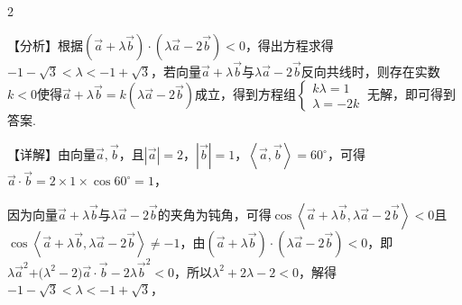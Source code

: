 \begin{multicols}{2}






\bindp 【分析】根据\(\left( \overrightarrow{a} + \lambda\overrightarrow{b} \right) \cdot \allowbreak\left( \lambda\overrightarrow{a} - 2\overrightarrow{b} \right) < 0\)，得出方程求得\(- 1 - \sqrt{3} < \lambda < - 1 + \sqrt{3}\)，若向量\(\overrightarrow{a} + \lambda\overrightarrow{b}\)与\(\lambda\overrightarrow{a} - 2\overrightarrow{b}\)反向共线时，则存在实数\(k < 0\)使得\(\overrightarrow{a} + \lambda\overrightarrow{b} = k(\lambda\overrightarrow{a} - 2\overrightarrow{b})\)成立，得到方程组\(\left\{ \begin{array}{r}
k\lambda = 1 \\
\lambda = - 2k
\end{array} \right.\ \)无解，即可得到答案.

\bindp 【详解】由向量\(\overrightarrow{a},\overrightarrow{b}\)，且\(\left| \overrightarrow{a} \right| = 2\)，\(\left| \overrightarrow{b} \right| = 1\)，\(\left\langle \overrightarrow{a},\overrightarrow{b} \right\rangle = 60^{\circ}\)，可得\(\overrightarrow{a} \cdot \overrightarrow{b} = 2 \times 1 \times \cos 60^{\circ} = 1\)，

\bindp 因为向量\(\overrightarrow{a} + \lambda\overrightarrow{b}\)与\(\lambda\overrightarrow{a} - 2\overrightarrow{b}\)的夹角为钝角，可得\(\cos\left\langle \overrightarrow{a} + \lambda\overrightarrow{b},\lambda\overrightarrow{a} - 2\overrightarrow{b} \right\rangle < 0\)且\(\cos\left\langle \overrightarrow{a} + \lambda\overrightarrow{b},\lambda\overrightarrow{a} - 2\overrightarrow{b} \right\rangle \neq - 1\)，由\(\left( \overrightarrow{a} + \lambda\overrightarrow{b} \right) \cdot \allowbreak\left( \lambda\overrightarrow{a} - 2\overrightarrow{b} \right) < 0\)，即\(\lambda{\overrightarrow{a}}^{2}\text{+(}\lambda^{2} - 2)\overrightarrow{a} \cdot \overrightarrow{b} - 2\lambda{\overrightarrow{b}}^{2} < 0\)，所以\(\lambda^{2} + 2\lambda - 2 < 0\)，解得\(- 1 - \sqrt{3} < \lambda < - 1 + \sqrt{3}\)，


\end{multicols}
